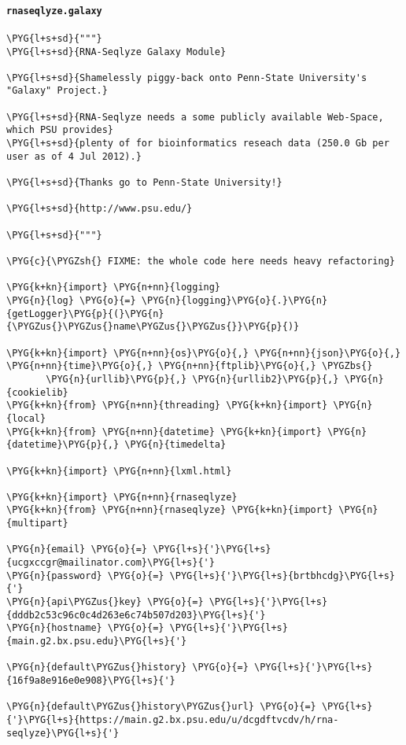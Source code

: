 \paragraph{\texttt{rnaseqlyze.galaxy}}
\label{index-pdf4:rnaseqlyze-galaxy}
\begin{Verbatim}[commandchars=\\\{\}]
\PYG{l+s+sd}{"""}
\PYG{l+s+sd}{RNA-Seqlyze Galaxy Module}

\PYG{l+s+sd}{Shamelessly piggy-back onto Penn-State University's "Galaxy" Project.}

\PYG{l+s+sd}{RNA-Seqlyze needs a some publicly available Web-Space, which PSU provides}
\PYG{l+s+sd}{plenty of for bioinformatics reseach data (250.0 Gb per user as of 4 Jul 2012).}

\PYG{l+s+sd}{Thanks go to Penn-State University!}

\PYG{l+s+sd}{http://www.psu.edu/}

\PYG{l+s+sd}{"""}

\PYG{c}{\PYGZsh{} FIXME: the whole code here needs heavy refactoring}

\PYG{k+kn}{import} \PYG{n+nn}{logging}
\PYG{n}{log} \PYG{o}{=} \PYG{n}{logging}\PYG{o}{.}\PYG{n}{getLogger}\PYG{p}{(}\PYG{n}{\PYGZus{}\PYGZus{}name\PYGZus{}\PYGZus{}}\PYG{p}{)}

\PYG{k+kn}{import} \PYG{n+nn}{os}\PYG{o}{,} \PYG{n+nn}{json}\PYG{o}{,} \PYG{n+nn}{time}\PYG{o}{,} \PYG{n+nn}{ftplib}\PYG{o}{,} \PYGZbs{}
       \PYG{n}{urllib}\PYG{p}{,} \PYG{n}{urllib2}\PYG{p}{,} \PYG{n}{cookielib}
\PYG{k+kn}{from} \PYG{n+nn}{threading} \PYG{k+kn}{import} \PYG{n}{local}
\PYG{k+kn}{from} \PYG{n+nn}{datetime} \PYG{k+kn}{import} \PYG{n}{datetime}\PYG{p}{,} \PYG{n}{timedelta}

\PYG{k+kn}{import} \PYG{n+nn}{lxml.html}

\PYG{k+kn}{import} \PYG{n+nn}{rnaseqlyze}
\PYG{k+kn}{from} \PYG{n+nn}{rnaseqlyze} \PYG{k+kn}{import} \PYG{n}{multipart}

\PYG{n}{email} \PYG{o}{=} \PYG{l+s}{'}\PYG{l+s}{ucgxccgr@mailinator.com}\PYG{l+s}{'}
\PYG{n}{password} \PYG{o}{=} \PYG{l+s}{'}\PYG{l+s}{brtbhcdg}\PYG{l+s}{'}
\PYG{n}{api\PYGZus{}key} \PYG{o}{=} \PYG{l+s}{'}\PYG{l+s}{dddb2c53c96c0c4d263e6c74b507d203}\PYG{l+s}{'}
\PYG{n}{hostname} \PYG{o}{=} \PYG{l+s}{'}\PYG{l+s}{main.g2.bx.psu.edu}\PYG{l+s}{'}

\PYG{n}{default\PYGZus{}history} \PYG{o}{=} \PYG{l+s}{'}\PYG{l+s}{16f9a8e916e0e908}\PYG{l+s}{'}

\PYG{n}{default\PYGZus{}history\PYGZus{}url} \PYG{o}{=} \PYG{l+s}{'}\PYG{l+s}{https://main.g2.bx.psu.edu/u/dcgdftvcdv/h/rna-seqlyze}\PYG{l+s}{'}


\end{Verbatim}
